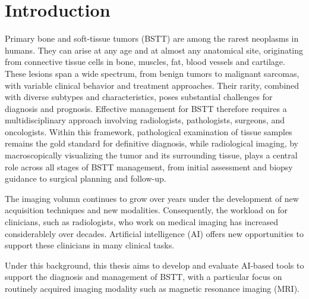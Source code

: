 
%	
%	
\chapter{Introduction}\label{chap: introduction}
\newpage

Primary bone and soft-tissue tumors (BSTT) are among the rarest neoplasms in humans. 
They can arise at any age and at almost any anatomical site, originating from connective tissue cells in 
bone, muscles, fat, blood vessels and cartilage. 
These lesions span a wide spectrum, from benign tumors to malignant sarcomas, with variable clinical behavior and treatment approaches.
Their rarity, combined with diverse subtypes and characteristics, poses substantial challenges for diagnosis and prognosis. 
Effective management for BSTT therefore requires a multidisciplinary approach involving radiologists, pathologists, surgeons, and oncologists. 
Within this framework, pathological examination of tissue samples remains the gold standard for definitive diagnosis, 
while radiological imaging, by macroscopically visualizing the tumor and its surrounding tissue, 
plays a central role across all stages of BSTT management, 
from initial assessment and biopsy guidance to surgical planning and follow-up.

The imaging volumn continues to grow over years under the development of new acquisition techniques and new modalities. 
Consequently, the workload on for clinicians, such as radiologists, who work on medical imaging has increased considerablely over decades.
Artificial intelligence (AI) offers new opportunities to support these clinicians in many clinical tasks.

Under this background, this thesis aims to develop and evaluate AI-based tools to support the diagnosis and management of BSTT, 
with a particular focus on routinely acquired imaging modality such as magnetic resonance imaging (MRI). 


